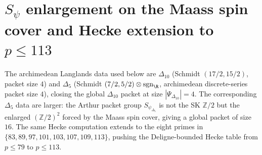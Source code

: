 \section{$S_\psi$ enlargement on the Maass
spin cover and Hecke extension to $p \le 113$}
\label{sec:dl-supplement-ii}

The archimedean Langlands data used below are
$\Delta_{10}$ (Schmidt $(17/2, 15/2)$, packet size $4$) and
$\Delta_5$ (Schmidt $(7/2, 5/2)\otimes\mathrm{sgn}_\R$, archimedean
discrete-series packet size $4$), closing the global $\Delta_{10}$
packet at size $|\Psi_{\Delta_{10}}| = 4$. The corresponding
$\Delta_5$ data are larger: the Arthur packet group
$S_{\psi_{\Delta_5}}$ is not the SK $\mathbb{Z}/2$ but the enlarged
$(\mathbb{Z}/2)^2$ forced by the Maass spin cover, giving a global
packet of size $16$. The same Hecke computation extends to the
eight primes in $\{83, 89, 97, 101, 103, 107, 109, 113\}$, pushing
the Deligne-bounded Hecke table from $p \le 79$ to $p \le 113$.


